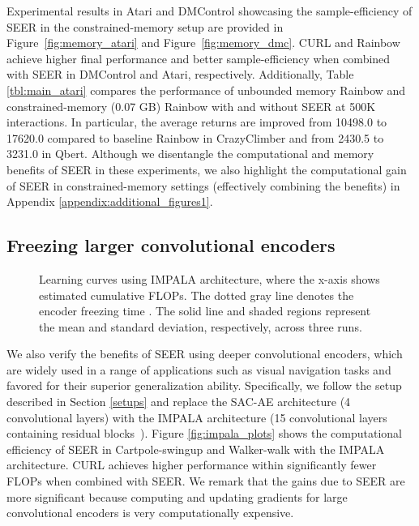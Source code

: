\documentclass{article}
\begin{document}
Experimental results in Atari and DMControl showcasing the sample-efficiency of SEER in the constrained-memory setup are provided in Figure~\ref{fig:memory_atari} and Figure~\ref{fig:memory_dmc}. CURL and Rainbow achieve higher final performance and better sample-efficiency when combined with SEER in DMControl and Atari, respectively. 
Additionally, Table \ref{tbl:main_atari} compares the performance of unbounded memory Rainbow and constrained-memory (0.07 GB) Rainbow with and without SEER at 500K interactions. In particular, the average returns are improved from 10498.0 to 17620.0 compared to baseline Rainbow in CrazyClimber and from 2430.5 to 3231.0 in Qbert.
Although we disentangle the computational and memory benefits of SEER in these experiments, 
we also highlight the computational gain of SEER in constrained-memory settings (effectively combining the benefits) in Appendix \ref{appendix:additional_figures1}.


\subsection{Freezing larger convolutional encoders} \label{impala}
\begin{wrapfigure}{r}{0.48\textwidth} \centering
\vspace{-20mm}
\vspace{-1mm}
\caption{Learning curves using IMPALA architecture, where the x-axis shows estimated cumulative FLOPs. The dotted gray line denotes the encoder freezing time . The solid line and shaded regions represent the mean and standard deviation, respectively, across three runs.}
\vspace{-0.2in}
\end{wrapfigure} \label{fig:impala_plots}

We also verify the benefits of SEER using deeper convolutional encoders, which are widely used in a range of applications such as visual navigation tasks and favored for their superior generalization ability.
Specifically, 
we follow the setup described in Section \ref{setups} and replace the SAC-AE architecture (4 convolutional layers) with the IMPALA architecture \citep{espeholt2018impala} (15 convolutional layers containing residual blocks~\citep{he2016deep}).
Figure \ref{fig:impala_plots} shows the computational efficiency of SEER in Cartpole-swingup and Walker-walk with the IMPALA architecture. CURL achieves higher performance within significantly fewer FLOPs when combined with SEER.
We remark that the gains due to SEER are more significant because computing and updating gradients for large convolutional encoders is very computationally expensive.
\end{document}
